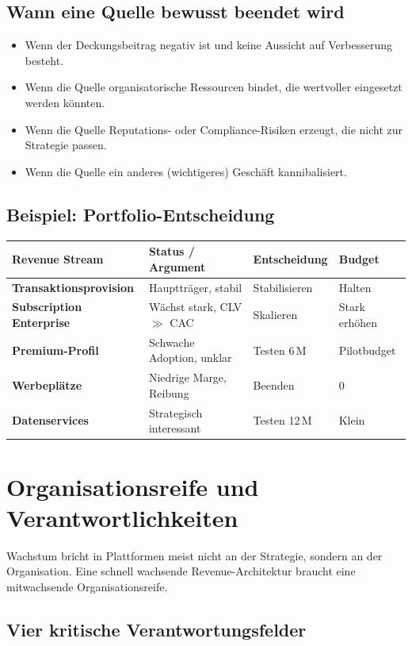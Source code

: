 \documentclass[11pt,a4paper,oneside]{article}
\begin{document}
\subsection{Wann eine Quelle bewusst beendet wird}

\begin{itemize}
  \item Wenn der Deckungsbeitrag negativ ist und keine Aussicht auf Verbesserung besteht.
  \item Wenn die Quelle organisatorische Ressourcen bindet, die wertvoller eingesetzt werden könnten.
  \item Wenn die Quelle Reputations- oder Compliance-Risiken erzeugt, die nicht zur Strategie passen.
  \item Wenn die Quelle ein anderes (wichtigeres) Geschäft kannibalisiert.
\end{itemize}

\subsection{Beispiel: Portfolio-Entscheidung}

\begin{tabularx}{\linewidth}{@{}>{\bfseries}l X l l@{}}
\toprule
Revenue Stream & Status / Argument & Entscheidung & Budget \\
\midrule
Transaktionsprovision & Hauptträger, stabil & Stabilisieren & Halten \\
Subscription Enterprise & Wächst stark, CLV $\gg$ CAC & Skalieren & Stark erhöhen \\
Premium-Profil & Schwache Adoption, unklar & Testen 6\,M & Pilotbudget \\
Werbeplätze & Niedrige Marge, Reibung & Beenden & 0 \\
Datenservices & Strategisch interessant & Testen 12\,M & Klein \\
\bottomrule
\end{tabularx}

\section{Organisationsreife und Verantwortlichkeiten}

Wachstum bricht in Plattformen meist nicht an der Strategie, sondern an der Organisation. Eine schnell wachsende Revenue-Architektur braucht eine mitwachsende Organisationsreife.

\subsection{Vier kritische Verantwortungsfelder}
\end{document}

